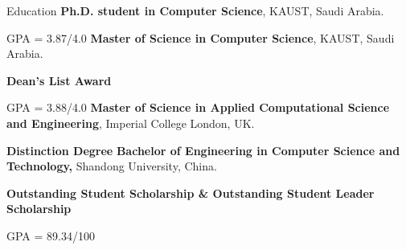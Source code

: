 \begin{rubric}{Education}
%
	\textbf{Ph.D. student in Computer Science}, KAUST, Saudi Arabia.
	\par GPA = 3.87/4.0
%
%
	\textbf{Master of Science in Computer Science}, KAUST, Saudi Arabia.
	\par \textbf{Dean's List Award} 
	\par GPA = 3.88/4.0
% 
%
	\textbf{Master of Science in Applied Computational Science and Engineering}, Imperial College London, UK.
	\par \textbf{Distinction Degree}
%
	\textbf{Bachelor of Engineering in Computer Science and Technology,} Shandong University, China.
	\par \textbf{Outstanding Student Scholarship \& Outstanding Student Leader Scholarship}
	\par GPA = 89.34/100
\end{rubric}